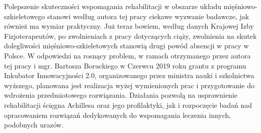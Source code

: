 Polepszenie skuteczności wspomagania rehabilitacji w obszarze układu mięśniowo-szkieletowego stanowi według autora tej pracy ciekawe wyzwanie badawcze, jak również ma wymiar praktyczny. Już teraz bowiem, według danych Krajowej Izby Fizjoterapeutów, po zwolnieniach z pracy dotyczących ciąży, zwolnienia na skutek dolegliwości mięśniowo-szkieletowych stanowią drugi powód absencji w pracy w Polsce. \linebreak W odpowiedzi na rosnący problem, w ramach otrzymanego przez autora tej pracy i mgr. Bartosza Boruckiego w Czerwcu 2019 roku grantu z programu Inkubator Innowacyjności 2.0, organizowanego przez ministra nauki i szkolnictwa wyższego, planowana jest realizacja wyżej wymienionych prac i przygotowanie do wdrożenia przedmiotowego rozwiązania. Działania pozwolą na usprawnienie rehabilitacji ścięgna Achillesa oraz jego profilaktyki, jak i rozpoczęcie badań nad opracowaniem rozwiązań dedykowanych do wspomagania leczenia innych, podobnych urazów.






